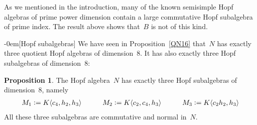 \documentclass{article}
\makeatletter
\renewcommand{\subsection}{\@startsection{subsection}{2}{0em}%
{\baselineskip}{-0em}{\bfseries\normalsize}}
\numberwithin{equation}{section}
\theoremstyle{definition}
\newtheorem*{prop}{Proposition}
\theoremstyle{break}
\newcommand{\deq}{\vcentcolon =}
\newcommand{\1}{{(1)}}
\newcommand{\2}{{(2)}}
\newcommand{\3}{{(3)}}
\makeatother
\begin{document}
As we mentioned in the introduction, many of the known semisimple Hopf algebras of prime power dimension contain a large commutative Hopf subalgebra of prime index. The result above shows that~$B$ is not of this kind.


\subsection[Hopf subalgebras]{} \label{HSA}
We have seen in Proposition~\ref{QN16} that~$N$ has exactly three quotient Hopf algebras of dimension~$8$. It has also exactly three Hopf subalgebras of dimension~$8$:
\begin{prop}
The Hopf algebra~$N$ has exactly three Hopf subalgebras of dimension~$8$, namely
\begin{align*}
M_1 \deq K\langle c_4, h_2, h_3 \rangle \qquad \quad
M_2 \deq K\langle c_2, c_4, h_3 \rangle \qquad \quad
M_3 \deq K\langle c_2 h_2, h_3 \rangle
\end{align*}
All these three subalgebras are commutative and normal in~$N$.
\end{prop}
\end{document}
